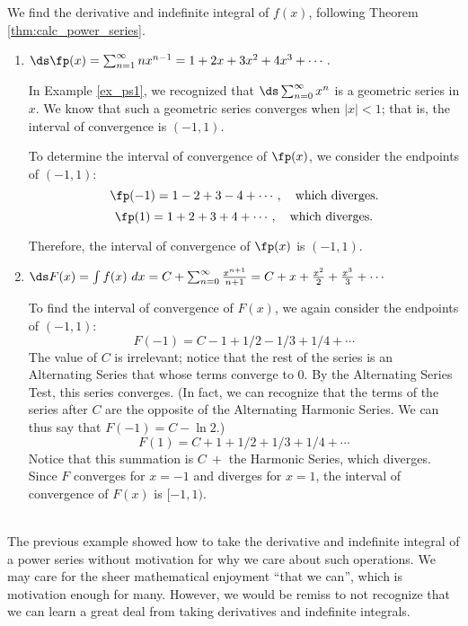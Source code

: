 {We find the derivative and indefinite integral of $f(x)$, following Theorem \ref{thm:calc_power_series}.\\

\begin{enumerate}

\item $\ds \fp(x) = \sum_{n=1}^\infty nx^{n-1} = 1+2x+3x^2+4x^3+\cdots.$

In Example \ref{ex_ps1}, we recognized that $\ds \sum_{n=0}^\infty x^n$ is a geometric series in $x$. We know that such a geometric series converges when $|x|<1$; that is, the interval of convergence is $(-1,1)$.

To determine the interval of convergence of $\fp(x)$, we consider the endpoints of $(-1,1)$:
$$\fp(-1) =  1-2+3-4+\cdots,\quad \text{which diverges.}$$
$$\fp(1) = 1+2+3+4+\cdots,\quad \text{which diverges.}$$

Therefore, the interval of convergence of $\fp(x)$ is $(-1,1)$. 

\item $\ds F(x) = \int f(x)\ dx = C+\sum_{n=0}^\infty \frac{x^{n+1}}{n+1} = C+ x+\frac{x^2}{2}+\frac{x^3}3+\cdots$

To find the interval of convergence of $F(x)$, we again consider the endpoints of $(-1,1)$:
$$F(-1) = C-1+1/2-1/3+1/4+\cdots$$
The value of $C$ is irrelevant; notice that the rest of the series is an Alternating Series that whose terms converge to 0. By the Alternating Series Test, this series converges. (In fact, we can recognize that the terms of the series after $C$ are the opposite of the Alternating Harmonic Series. We can thus say that $F(-1) = C-\ln 2$.)
$$F(1) = C+1+1/2+1/3+1/4+\cdots$$
Notice that this summation is $C\ +$ the Harmonic Series, which diverges. Since $F$ converges for $x=-1$ and diverges for $x=1$, the interval of convergence of $F(x)$ is $[-1,1)$.
\end{enumerate}
\baselineskip
}\\

The previous example showed how to take the derivative and indefinite integral of a power series without motivation for why we care about such operations. We may care for the sheer mathematical enjoyment ``that we can'', which is motivation enough for many. However, we would be remiss to not recognize that we can learn a great deal from taking derivatives and indefinite integrals.\\ 

